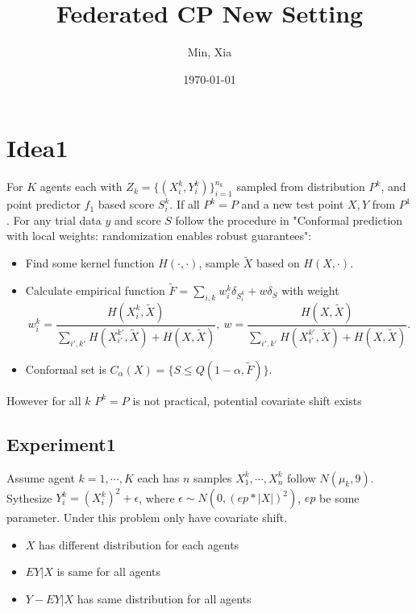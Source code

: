 \documentclass[12pt, a4paper, oneside]{article}
\title{\textbf{Federated CP New Setting}}
\author{Min, Xia}
\date{\today}
\begin{document}
\maketitle
\setcounter{page}{1}
\section{Idea1}
    For $K$ agents each with $Z_k=\{(X_i^k,Y_i^k)\}_{i=1}^{n_k}$ sampled from distribution $P^k$, and point predictor $f_1$ based score $S_i^k$. If all $P^k=P$ and a new test point $X,Y$ from $P^1$. For any trial data $y$ and score $S$ follow the procedure in "Conformal prediction with local weights: randomization enables robust guarantees"\cite{hore2023conformal}:
    \begin{itemize}
        \item Find some kernel function $H(\cdot,\cdot)$, sample $\tilde{X}$ based on $H(X,\cdot)$.
        \item Calculate empirical function $\tilde{F}=\overset{}{\underset{i,k}\sum}w_i^k\delta_{S_i^k}+w\delta_{S}$ with weight
        \begin{equation*}
            w_i^k=\dfrac{H(X_i^k,\tilde{X})}{\overset{}{\underset{i',k'}\sum}H(X_{i'}^{k'},\tilde{X})+H(X,\tilde{X})},\ w=\dfrac{H(X,\tilde{X})}{\overset{}{\underset{i',k'}\sum}H(X_{i'}^{k'},\tilde{X})+H(X,\tilde{X})}.
        \end{equation*}
        \item Conformal set is $C_\alpha(X)=\{S\leq Q(1-\alpha,\tilde{F})\}$.
    \end{itemize}


    However for all $k$ $P^k=P$ is not practical, potential covariate shift exists

\subsection{Experiment1}
    Assume agent $k=1,\cdots,K$ each has $n$ samples $X_1^k,\cdots,X_n^k$ follow $N(\mu_k,9)$. Sythesize $Y_i^k=(X_i^k)^2+\epsilon$, where $\epsilon\sim N(0,(ep*|X|)^2)$, $ep$ be some parameter. Under this problem only have covariate shift.

    \begin{itemize}
        \item $X$ has different distribution for each agents
        \item $EY|X$ is same for all agents
        \item $Y-EY|X$ has same distribution for all agents
    \end{itemize}
    
\end{document}
